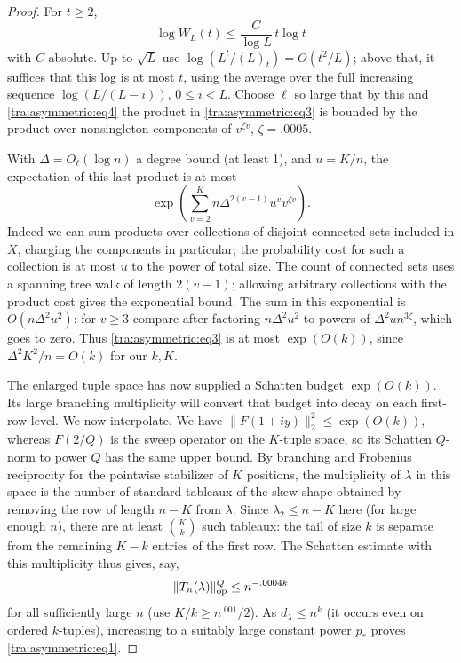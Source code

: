 \begin{proof}
For \(t\ge 2\),
\[
                         \log W_L(t)\le \frac{C}{\log L}\,t\log t
\]
with \(C\) absolute. Up to \(\sqrt L\) use \(\log(L^t/(L)_t)=O(t^2/L)\); above that, it suffices that this log is at most \(t\), using the average over the full increasing sequence \(\log(L/(L-i)),\,0\le i<L\). Choose \(\ell\) so large that by this and \eqref{tra:asymmetric:eq4} the product in \eqref{tra:asymmetric:eq3} is bounded by the product over nonsingleton components of
\(v^{\zeta v}\), \(\zeta=.0005\).

With \(\Delta=O_\ell(\log n)\) a degree bound (at least 1), and \(u=K/n\), the expectation of this last product is at most
\[
                  \exp\left(\sum_{v=2}^K n\Delta^{2(v-1)} u^v v^{\zeta v}\right).
\]
Indeed we can sum products over collections of disjoint connected sets included in \(X\), charging the components in particular; the probability cost for such a collection is at most \(u\) to the power of total size. The count of connected sets uses a spanning tree walk of length \(2(v-1)\); allowing arbitrary collections with the product cost gives the exponential bound. The sum in this exponential is \(O(n\Delta^2 u^2)\): for \(v\ge3\) compare after factoring \(n\Delta^2 u^2\) to powers of \(\Delta^2 u n^{3\zeta}\), which goes to zero. Thus \eqref{tra:asymmetric:eq3} is at most \(\exp(O(k))\), since \(\Delta^2 K^2/n=O(k)\) for our \(k,K\).

The enlarged tuple space has now supplied a Schatten budget
$\exp(O(k))$. Its large branching multiplicity will convert that budget
into decay on each first-row level. We now interpolate. We have \(\|F(1+iy)\|_2^2\le\exp(O(k))\), whereas \(F(2/Q)\) is the sweep operator on the \(K\)-tuple space, so its Schatten \(Q\)-norm to power \(Q\) has the same upper bound. By branching and Frobenius reciprocity for the pointwise stabilizer of \(K\) positions, the multiplicity of \(\lambda\) in this space is the number of standard tableaux of the skew shape obtained by removing the row of length \(n-K\) from \(\lambda\). Since \(\lambda_2\le n-K\) here (for large enough \(n\)), there are at least \(\binom Kk\) such tableaux: the tail of size \(k\) is separate from the remaining \(K-k\) entries of the first row. The Schatten estimate with this multiplicity thus gives, say,
\[
                         \|T_n(\lambda)\|_{\rm op}^Q\le n^{-.0004 k}
\]
for all sufficiently large \(n\) (use \(K/k\ge n^{.001}/2\)). As \(d_\lambda\le n^k\) (it occurs even on ordered \(k\)-tuples), increasing to a suitably large constant power \(p_*\) proves \eqref{tra:asymmetric:eq1}.
\end{proof}
